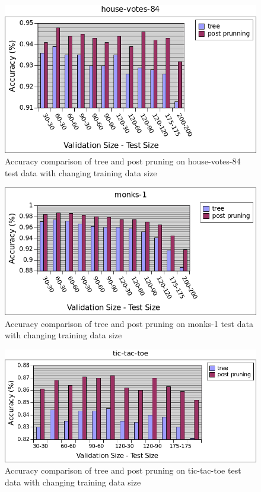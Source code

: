 \documentclass[12pt]{article}
\begin{document}
\begin{figure}[H]
  \centering
  \includegraphics[scale=0.5]{img/house-votes-84-comparison}
  \caption{Accuracy comparison of tree and post pruning on house-votes-84 test data with changing training data size}
  \label{fig:house-comp}
\end{figure}

\begin{figure}[H]
  \centering
  \includegraphics[scale=0.5]{img/monks-1-comparison}
  \caption{Accuracy comparison of tree and post pruning on monks-1 test data with changing training data size}
  \label{fig:monk-comp}
\end{figure}

\begin{figure}[H]
  \centering
  \includegraphics[scale=0.5]{img/tic-tac-toe-comparison}
  \caption{Accuracy comparison of tree and post pruning on tic-tac-toe test data with changing training data size}
  \label{fig:tictactoe-comp}
\end{figure}
\end{document}
